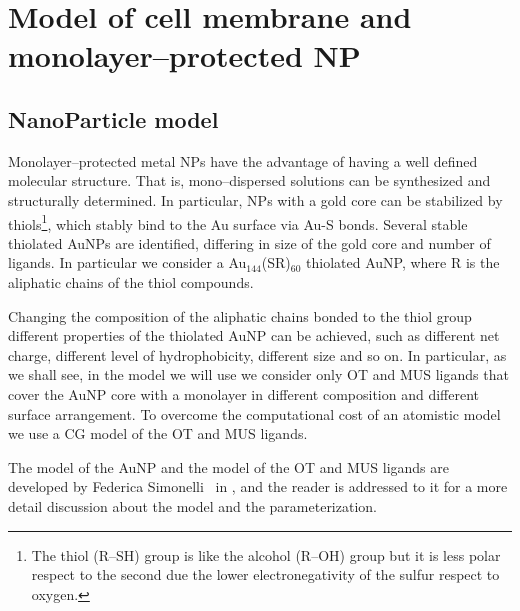 \chapter{Model of cell membrane and monolayer--protected NP}

\section{NanoParticle model}
Monolayer--protected metal \acp{NP} have the advantage of having a well defined molecular structure. That is, mono--dispersed solutions can be synthesized and structurally determined. In particular, \acp{NP} with a gold core can be stabilized by thiols\footnote{The thiol (R--SH) group is like the alcohol (R--OH) group but it is less polar respect to the second due the lower electronegativity of the sulfur respect to oxygen.}, which stably bind to the Au surface via Au-S bonds. 
Several stable thiolated \acp{AuNP} are identified, differing in size of the gold core and number of ligands. In particular we consider a {Au$_{144}$(SR)$_{60}$} thiolated \ac{AuNP}, where R is the aliphatic chains of the thiol compounds. 

Changing the composition of the aliphatic chains bonded to the thiol group different properties of the thiolated \ac{AuNP} can be achieved, such as different net charge, different level of hydrophobicity, different size and so on. In particular, as we shall see, in the model we will use we consider only \ac{OT} and \ac{MUS} ligands that cover the \ac{AuNP} core with a monolayer in different composition and different surface arrangement. To overcome the computational cost of an atomistic model we use a \martini \ac{CG} model of the \ac{OT} and \ac{MUS} ligands. 

The model of the \ac{AuNP} and the \martini model of the \ac{OT} and \ac{MUS} ligands are developed by Federica Simonelli \etal\, in \cite{ourPaper}, and the reader is addressed to it for a more detail discussion about the model and the parameterization.


